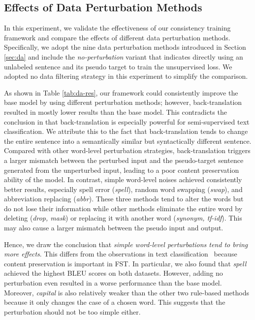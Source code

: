 \subsection{Effects of Data Perturbation Methods}
\label{sec:dp}
In this experiment, we validate the effectiveness of our consistency training framework and compare the effects of different data perturbation methods. Specifically, we adopt the nine data perturbation methods introduced in Section \ref{sec:da} and include the \textit{no-perturbation} variant that indicates directly using an unlabeled sentence and its pseudo target to train the unsupervised loss. We adopted no data filtering strategy in this experiment to simplify the comparison. 

As shown in Table \ref{tab:da-res}, our framework could consistently improve the base model by using different perturbation methods; however, back-translation resulted in mostly lower results than the base model. This contradicts the conclusion in \cite{xie2020unsupervised} that back-translation is especially powerful for semi-supervised text classification. We attribute this to the fact that back-translation tends to change the entire sentence into a semantically similar but syntactically different sentence. Compared with other word-level perturbation strategies, back-translation triggers a larger mismatch between the perturbed input and the pseudo-target sentence generated from the unperturbed input, leading to a poor content preservation ability of the model. In contrast, simple word-level noises achieved consistently better results, especially spell error (\textit{spell}), random word swapping (\textit{swap}), and abbreviation replacing (\textit{abbr}). These three methods tend to alter the words but do not lose their information while other methods eliminate the entire word by deleting (\textit{drop, mask}) or replacing it with another word (\textit{synonym, tf-idf}). This may also cause a larger mismatch between the pseudo input and output. 

Hence, we draw the conclusion that \textit{simple word-level perturbations tend to bring more effects}. This differs from the observations in text classification~\cite{xie2020unsupervised} because content preservation is important in FST. In particular, we also found that \textit{spell} achieved the highest BLEU scores on both datasets. However, adding no perturbation even resulted in a worse performance than the base model. Moreover, \textit{capital} is also relatively weaker than the other two rule-based methods because it only changes the case of a chosen word. This suggests that the perturbation should not be too simple either. 


